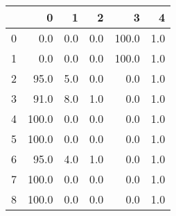 \begin{tabular}{lrrrrr}
\toprule
{} &      0 &    1 &    2 &      3 &    4 \\
\midrule
0 &    0.0 &  0.0 &  0.0 &  100.0 &  1.0 \\
1 &    0.0 &  0.0 &  0.0 &  100.0 &  1.0 \\
2 &   95.0 &  5.0 &  0.0 &    0.0 &  1.0 \\
3 &   91.0 &  8.0 &  1.0 &    0.0 &  1.0 \\
4 &  100.0 &  0.0 &  0.0 &    0.0 &  1.0 \\
5 &  100.0 &  0.0 &  0.0 &    0.0 &  1.0 \\
6 &   95.0 &  4.0 &  1.0 &    0.0 &  1.0 \\
7 &  100.0 &  0.0 &  0.0 &    0.0 &  1.0 \\
8 &  100.0 &  0.0 &  0.0 &    0.0 &  1.0 \\
\bottomrule
\end{tabular}
